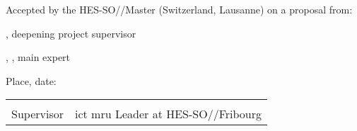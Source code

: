 Accepted by the HES-SO//Master (Switzerland, Lausanne) on a proposal from:

\vspace{0.5cm}

\Supervisor, deepening project supervisor

\Expert, \ExpertLab, main expert

\vspace{1cm}

Place, date: \underline{\hspace{8cm}}

\vspace{3cm}

{ \renewcommand{\arraystretch}{1.5}
\begin{tabularx}{\textwidth}{X X}
	\Supervisor  & \MRU\\
	Supervisor   & \acrshort{ict} \acrshort{mru} Leader at HES-SO//Fribourg\\
\end{tabularx}
}